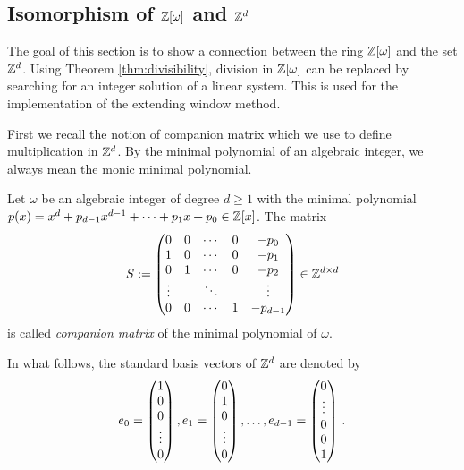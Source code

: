\begin{upravit}
\section{\texorpdfstring{Isomorphism of $\mathbb{Z}[\omega]$ and $\mathbb{Z}^{d}$}{Isomorphism of Z[omega] and Zd}}
The goal of this section is to show a connection between the ring $\mathbb{Z}[\omega]$ and the set $\mathbb{Z}^d$. Using Theorem \ref{thm:divisibility}, division in $\mathbb{Z}[\omega]$ can be replaced by searching for an integer solution of a linear system. This is used for the implementation of the extending window method.

First we recall the notion of companion matrix which we use to define multiplication in $\mathbb{Z}^d$. By the minimal polynomial of an algebraic integer, we always mean the monic minimal polynomial.  
\begin{defn}
Let $\omega$ be an algebraic integer of degree $d\geq 1$ with the  minimal polynomial $p(x)=x^d +p_{d-1}x^{d-1}+ \cdots + p_1 x+p_0 \in \mathbb{Z}[x]$. The matrix 
$$
S := \begin{pmatrix}
            0 & 0 & \cdots & 0 & -p_0 \\
            1 & 0 & \cdots & 0 & -p_1 \\
            0 & 1 & \cdots & 0 & -p_2 \\
            \vdots &   & \ddots & & \vdots \\
            0 & 0 & \cdots & 1 & -p_{d-1} 
            \end{pmatrix} \in \mathbb{Z}^{d\times d}
$$
is called \emph{companion matrix} of the minimal polynomial of $\omega$.
\end{defn}
In what follows, the standard basis vectors of $\mathbb{Z}^d$  are denoted by 
$$
e_0=\begin{pmatrix}
              1 \\
              0 \\
              0 \\
              \vdots \\
              0
              \end{pmatrix}, \\
e_1=\begin{pmatrix}
              0 \\
              1 \\
              0 \\
              \vdots \\
              0
              \end{pmatrix}, \dots ,\\
e_{d-1}=\begin{pmatrix}
              0 \\        
              \vdots \\
              0 \\
              0\\
              1
              \end{pmatrix}\,.             
$$


\end{upravit}
